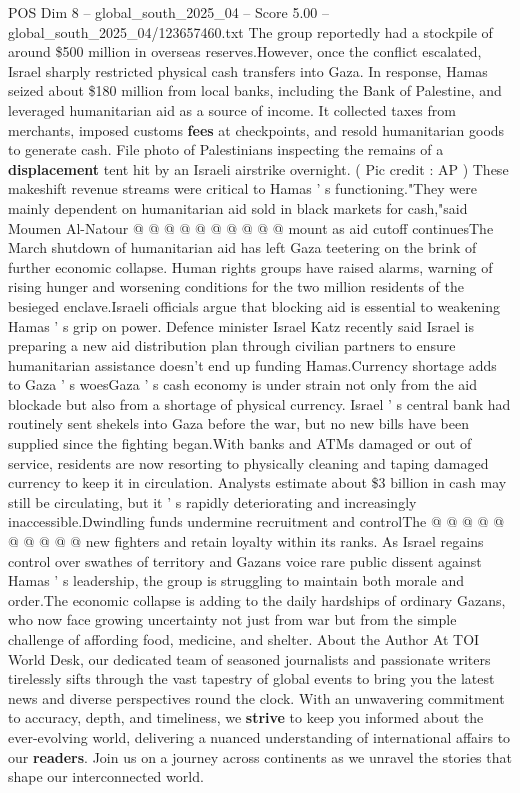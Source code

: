 \begin{textsample}{POS Dim 8 – global\_south\_2025\_04 – Score 5.00 – global\_south\_2025\_04/123657460.txt}
The group reportedly had a stockpile of around \$500 million in overseas reserves.However, once the conflict escalated, Israel sharply restricted physical cash transfers into Gaza.
In response, Hamas seized about \$180 million from local banks, including the Bank of Palestine, and leveraged humanitarian aid as a source of income.
It collected taxes from merchants, imposed customs \textbf{fees} at checkpoints, and resold humanitarian goods to generate cash.
File photo of Palestinians inspecting the remains of a \textbf{displacement} tent hit by an Israeli airstrike overnight. ( Pic credit : AP ) These makeshift revenue streams were critical to Hamas ' s functioning."They were mainly dependent on humanitarian aid sold in black markets for cash,"said Moumen Al-Natour @ @ @ @ @ @ @ @ @ @ mount as aid cutoff continuesThe March shutdown of humanitarian aid has left Gaza teetering on the brink of further economic collapse.
Human rights groups have raised alarms, warning of rising hunger and worsening conditions for the two million residents of the besieged enclave.Israeli officials argue that blocking aid is essential to weakening Hamas ' s grip on power.
Defence minister Israel Katz recently said Israel is preparing a new aid distribution plan through civilian partners to ensure humanitarian assistance doesn't end up funding Hamas.Currency shortage adds to Gaza ' s woesGaza ' s cash economy is under strain not only from the aid blockade but also from a shortage of physical currency.
Israel ' s central bank had routinely sent shekels into Gaza before the war, but no new bills have been supplied since the fighting began.With banks and ATMs damaged or out of service, residents are now resorting to physically cleaning and taping damaged currency to keep it in circulation.
Analysts estimate about \$3 billion in cash may still be circulating, but it ' s rapidly deteriorating and increasingly inaccessible.Dwindling funds undermine recruitment and controlThe @ @ @ @ @ @ @ @ @ @ new fighters and retain loyalty within its ranks.
As Israel regains control over swathes of territory and Gazans voice rare public dissent against Hamas ' s leadership, the group is struggling to maintain both morale and order.The economic collapse is adding to the daily hardships of ordinary Gazans, who now face growing uncertainty not just from war but from the simple challenge of affording food, medicine, and shelter.
About the Author At TOI World Desk, our dedicated team of seasoned journalists and passionate writers tirelessly sifts through the vast tapestry of global events to bring you the latest news and diverse perspectives round the clock.
With an unwavering commitment to accuracy, depth, and timeliness, we \textbf{strive} to keep you informed about the ever-evolving world, delivering a nuanced understanding of international affairs to our \textbf{readers}.
Join us on a journey across continents as we unravel the stories that shape our interconnected world.

\end{textsample}
